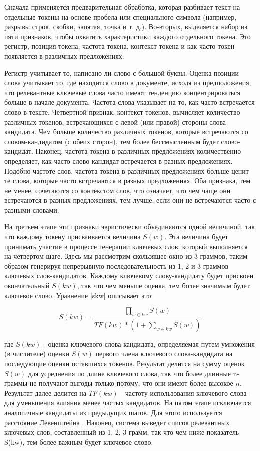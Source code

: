 \documentclass[14pt]{matmex-diploma-custom}
\begin{document}
Сначала применяется предварительная обработка, которая разбивает текст на отдельные токены на основе пробела или специального символа (например, разрывы строк, скобки, запятая, точка и т. д.). Во-вторых, выделяется набор из пяти признаков, чтобы охватить характеристики каждого отдельного токена. Это регистр, позиция токена, частота токена, контекст токена и как часто токен появляется в различных предложениях.

Регистр учитывает то, написано ли слово с большой буквы.
Оценка позиции слова учитывает то, где находится слово в документе, исходя из предположения, что релевантные ключевые слова часто имеют тенденцию концентрироваться больше в начале документа. 
Частота слова указывает на то, как часто встречается слово в тексте. Четвертной признак, контекст токенов, вычисляет количество различных токенов, встречающихся с левой (или правой) стороны слова-кандидата. Чем больше количество различных токенов, которые встречаются со словом-кандидатом (с обеих сторон), тем более бессмысленным будет слово-кандидат. Наконец, частота токена в различных предложениях количественно определяет, как часто слово-кандидат встречается в разных предложениях. Подобно частоте слов, частота токена в различных предложениях больше ценит те слова, которые часто встречаются в разных предложениях. Оба признака, тем не менее, сочетаются со контекстом слов, что означает, что чем чаще они встречаются в разных предложениях, тем лучше, если они не встречаются часто с разными словами. 

На третьем этапе эти признаки  эвристически объединяются одной величиной, так что каждому токену присваивается величина $S(w)$. Эта величина будет принимать участие в  процессе генерации ключевых слов, который выполняется на четвертом шаге. Здесь мы рассмотрим скользящее окно из 3 граммов, таким образом генерируя непрерывную последовательность из 1, 2 и 3 граммов ключевых слов-кандидатов. Каждому ключевому слову-кандидату будет присвоен окончательный $S(kw)$, так что чем меньше оценка, тем более значимым будет ключевое слово. Уравнение \ref{skw} описывает это:

\begin{equation}\label{skw}
    S(kw) = \frac{\prod_{w \in kw}{S(w)}}{TF(kw)*(1+\sum_{w\in kw}{S(w)})}
\end{equation}

где $S(kw)$ - оценка ключевого слова-кандидата, определяемая путем умножения (в числителе) оценки $S(w)$ первого члена ключевого слова-кандидата на последующие оценки оставшихся токенов. Результат делится на сумму оценок $S(w)$ для усреднения по длине ключевого слова, так что более длинные n-граммы не получают выгоды только потому, что они имеют более высокое $n$. Результат далее делится на $TF(kw)$ - частоту использования ключевого слова - для уменьшения влияния менее частых кандидатов. На пятом этапе исключается аналогичные кандидаты из предыдущих шагов. Для этого используется расстояние Левенштейна \cite{Levenshtein_SPD66}. Наконец, система выведет список релевантных ключевых слов, составленный из 1, 2, 3 грамм, так что чем ниже показатель S(kw), тем более важным будет ключевое слово.
\end{document}
